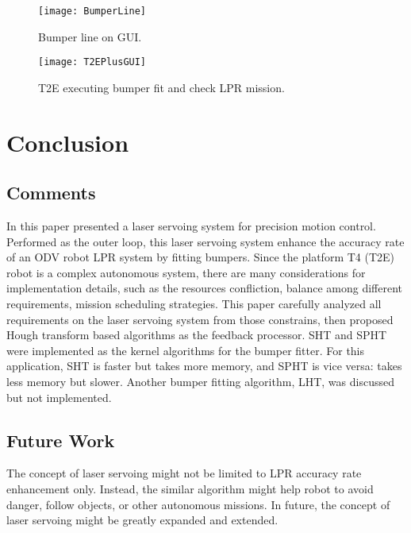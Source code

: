 \documentclass[]{spie}
\newcommand{\draft}{no} %
\def\grapath{../img/}
\def\bibdir{D:/zhen/mynote/bibdir}
\let\myimg\includegraphics
\renewcommand{\includegraphics}[2][width=0.45\textwidth]{\ifthenelse{\equal{\draft}{yes}} 
    {\centerline{\myimg[#1,draft]{\grapath #2}}}
    {%
        {\ifthenelse{\equal{\draft}{fast}}
            {\centerline{\fbox{Figure #2 will be here}}}
            {\centerline{\myimg[#1]{\grapath #2}}}
        }
    }
}
\begin{document}
\begin{figure}[!htb]
    \begin{minipage}{0.45\textwidth}
    \texttt{[image: BumperLine]}
    \caption{Bumper line on GUI.}\label{fig:PklotMap}
    \end{minipage}
    \begin{minipage}{0.45\textwidth}
    \texttt{[image: T2EPlusGUI]}
    \caption{T2E executing bumper fit and check LPR mission.}\label{fig:T2EPlusGUI}
    \end{minipage}
\end{figure}



\section{Conclusion}\label{sec:con}
\subsection{Comments}
    In this paper presented a laser servoing system for precision motion control. Performed as the outer loop, this laser servoing system enhance the accuracy rate of an ODV robot LPR system by fitting bumpers. Since the platform T4 (T2E) robot is a complex autonomous system, there are many considerations for implementation details, such as the resources confliction, balance among different requirements, mission scheduling strategies. This paper carefully analyzed all requirements on the laser servoing system from those constrains, then proposed Hough transform based algorithms as the feedback processor. SHT and SPHT were implemented as the kernel algorithms for the bumper fitter. For this application, SHT is faster but takes more memory, and SPHT is vice versa: takes less memory but slower. Another bumper fitting algorithm, LHT, was discussed but not implemented. 

\subsection{Future Work}
    The concept of laser servoing might not be limited to LPR accuracy rate enhancement only. Instead, the similar algorithm might help robot to avoid danger, follow objects, or other autonomous missions. In future, the concept of laser servoing might be greatly expanded and extended. 

\end{document}

